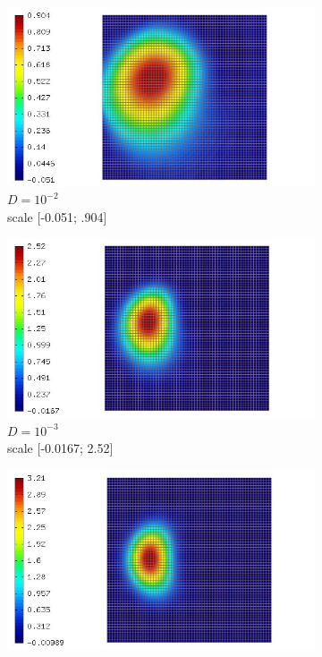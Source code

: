 \documentclass[mathserif]{beamer}
\begin{document}
\begin{frame}
\begin{figure}[H]
\begin{subfigure}[H]{0.02\textwidth}
	\end{subfigure}
	\begin{subfigure}[H]{0.3\textwidth}
		\centering
		\includegraphics[width=.9\textwidth, trim = 65mm 0mm 0mm 0mm, clip]{images/timedep-multiscale/stability/eps=001_201.jpg}
		\vspace{-3mm}
		\caption{$D = 10^{-2}$\\\vspace{-2mm}scale [-0.051; .904]}
	\end{subfigure}
	\begin{subfigure}[H]{0.3\textwidth}
		\centering
		\includegraphics[width=.9\textwidth, trim = 65mm 0mm 0mm 0mm, clip]{images/timedep-multiscale/stability/eps=0001_201.jpg}
		\vspace{-3mm}
		\caption{$D = 10^{-3}$\\\vspace{-2mm}scale [-0.0167; 2.52]}
	\end{subfigure}
	\begin{subfigure}[H]{0.3\textwidth}
		\centering
		\includegraphics[width=.9\textwidth, trim = 65mm 0mm 0mm 0mm, clip]{images/timedep-multiscale/stability/eps=0_201.jpg}

\end{subfigure}
\end{figure}
\end{frame}
\end{document}
